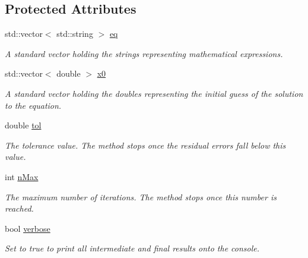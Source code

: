 \subsection*{Protected Attributes}
\begin{DoxyCompactItemize}
\item 
std\+::vector$<$ std\+::string $>$ \hyperlink{class_nonlinear_solver_aa3e3d193935e13c42599301497cb064d}{eq}\hypertarget{class_nonlinear_solver_aa3e3d193935e13c42599301497cb064d}{}\label{class_nonlinear_solver_aa3e3d193935e13c42599301497cb064d}

\begin{DoxyCompactList}\small\item\em A standard vector holding the strings representing mathematical expressions. \end{DoxyCompactList}\item 
std\+::vector$<$ double $>$ \hyperlink{class_nonlinear_solver_aa212aef76ebc599db6f0348c7df79c79}{x0}\hypertarget{class_nonlinear_solver_aa212aef76ebc599db6f0348c7df79c79}{}\label{class_nonlinear_solver_aa212aef76ebc599db6f0348c7df79c79}

\begin{DoxyCompactList}\small\item\em A standard vector holding the doubles representing the initial guess of the solution to the equation. \end{DoxyCompactList}\item 
double \hyperlink{class_nonlinear_solver_a8fa50d85cb58f69da6cddf52a2b950af}{tol}\hypertarget{class_nonlinear_solver_a8fa50d85cb58f69da6cddf52a2b950af}{}\label{class_nonlinear_solver_a8fa50d85cb58f69da6cddf52a2b950af}

\begin{DoxyCompactList}\small\item\em The tolerance value. The method stops once the residual errors fall below this value. \end{DoxyCompactList}\item 
int \hyperlink{class_nonlinear_solver_accd5129e5d683f9d8187bd9d4d13b023}{n\+Max}\hypertarget{class_nonlinear_solver_accd5129e5d683f9d8187bd9d4d13b023}{}\label{class_nonlinear_solver_accd5129e5d683f9d8187bd9d4d13b023}

\begin{DoxyCompactList}\small\item\em The maximum number of iterations. The method stops once this number is reached. \end{DoxyCompactList}\item 
bool \hyperlink{class_nonlinear_solver_a81db23a90d44eeea9b9ec57d8ea94155}{verbose}\hypertarget{class_nonlinear_solver_a81db23a90d44eeea9b9ec57d8ea94155}{}\label{class_nonlinear_solver_a81db23a90d44eeea9b9ec57d8ea94155}

\begin{DoxyCompactList}\small\item\em Set to true to print all intermediate and final results onto the console. \end{DoxyCompactList}\end{DoxyCompactItemize}


